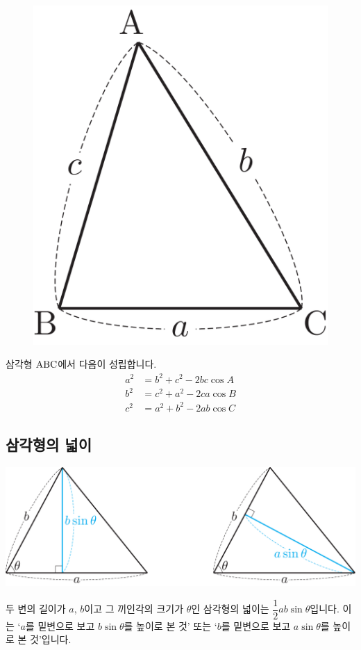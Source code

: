 \begin{figure}[h]
  \centering \includegraphics[scale=0.125]{pic0/pic165.pdf}\\
  \end{figure}
삼각형 $\mathrm{ABC}$에서 다음이 성립합니다.
\begin{align*}
a^2 &= b^2 + c^2 - 2bc\cos A \\ 
b^2 &= c^2 + a^2 - 2ca\cos B \\
c^2 &= a^2 + b^2 - 2ab\cos C
\end{align*}
\clearpage
\subsection{삼각형의 넓이}
\begin{center}
\includegraphics[scale=0.125]{pic0/pic160.pdf}
\end{center}두 변의 길이가 $a$, $b$이고 그 끼인각의 크기가 $\theta$인 삼각형의 넓이는 $\dfrac{1}{2}ab\sin\theta$입니다. 이는 `$a$를 밑변으로 보고 $b\sin\theta$를 높이로 본 것' 또는 `$b$를 밑변으로 보고 $a\sin\theta$를 높이로 본 것'입니다.

